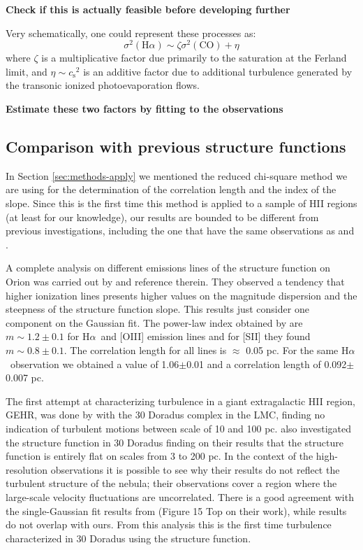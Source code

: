 \documentclass[fleqn,usenatbib, useAMS, a4paper]{mnras}
\newcommand\halpha{H${\alpha}$}
\newcommand\ha{\ensuremath{\text{H}\alpha}}
\newcommand*\chem[1]{\ensuremath{\mathrm{#1}}}
\newcommand\csound{\ensuremath{c_{\text{s}}}}
\begin{document}
\textbf{Check  if this is actually feasible before developing further}

Very schematically, one could represent these processes as:
\begin{equation}
  \label{eq:1}
  \sigma^2(\ha) \sim \zeta \sigma^2(\chem{CO}) + \eta
\end{equation}
where \(\zeta\) is a multiplicative factor
due primarily to the saturation at the Ferland limit,
and \(\eta \sim \csound^2\) is an additive factor due to additional turbulence
generated by the transonic ionized photoevaporation flows.

\textbf{Estimate these two factors by fitting to the observations}


\subsection{Comparison with previous structure functions}

In Section \ref{sec:methods-apply} we mentioned the reduced chi-square method we are using for the determination of the correlation length and the index of the slope. Since this is the first time this method is applied to a sample of HII regions (at least for our knowledge), our results are bounded to be different from previous investigations, including the one that have the same observations as \citet{arthur2016turbulence} and \citet{2019arXiv191203543M}. 

A complete analysis on different emissions lines of the structure function on Orion was carried out by \citet{arthur2016turbulence} and reference therein. 
They observed a tendency that higher ionization lines presents higher values on the magnitude dispersion and the steepness of the structure function slope. 
This results just consider one component on the Gaussian fit. 
The power-law index obtained by \citet{arthur2016turbulence} are \(m \sim 1.2 \pm 0.1\) for \halpha\ and [OIII] emission lines and for [SII] they found \(m \sim 0.8 \pm 0.1\). 
The correlation length for all lines is \(\approx\) 0.05 pc. For the same \halpha\ observation we obtained a value of 1.06$\pm$0.01 and a correlation length of 0.092$\pm$0.007 pc. 

The first attempt at characterizing turbulence in a giant extragalactic HII region, GEHR, was done by \citet{1961MNRAS.122....1F} with the 30 Doradus complex in the LMC, finding no indication of turbulent motions between scale of 10 and 100 pc.
\citet{2019arXiv191203543M} also investigated the structure function in 30 Doradus finding on their results that the structure function is entirely flat on scales from 3 to 200 pc.
In the context of the high-resolution observations it is possible to see why their results do not reflect the turbulent structure of the nebula; their observations cover a region where the large-scale velocity fluctuations are uncorrelated.
There is a good agreement with the single-Gaussian fit results from \citet{2019arXiv191203543M} (Figure 15 Top on their work), while \citet{1961MNRAS.122....1F} results do not overlap with ours.
From this analysis this is the first time turbulence characterized in 30 Doradus using the structure function.
\end{document}
